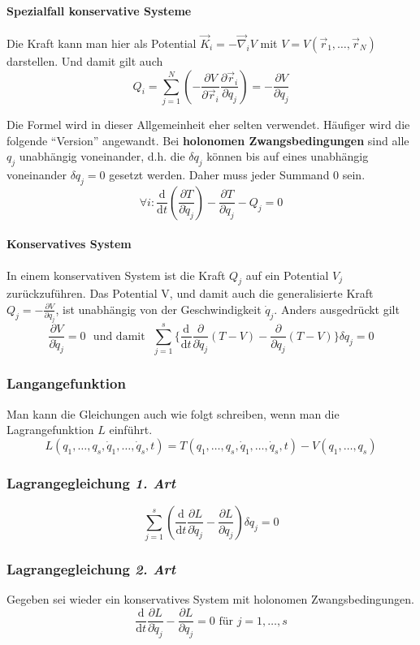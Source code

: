 \documentclass[oneside]{book}
\theoremstyle{definition}
\renewcommand{\d}{\mathrm d}
\newcommand{\dd}[1]{\frac{\d}{\d #1}}
\newcommand{\fpartial}[1]{\frac{\partial}{\partial #1}}
\newcommand{\ffpartial}[2]{\frac{\partial #1}{\partial #2}}
\begin{document}
\paragraph{Spezialfall konservative Systeme}
Die Kraft kann man hier als Potential $\vec{K}_i = - \vec\nabla_i V$ mit $V = V(\vec{r}_1, \dots, \vec{r}_N)$ darstellen. Und damit gilt auch
$$Q_i = \sum_{j = 1}^N (- \frac{\partial V}{\partial \vec{r}_i} \ffpartial{\vec{r}_i}{q_j}) = - \ffpartial{V}{q_j}$$

Die Formel wird in dieser Allgemeinheit eher selten verwendet. Häufiger wird die folgende "`Version"' angewandt. Bei \textbf{holonomen Zwangsbedingungen} sind alle $q_j$ unabhängig voneinander, d.h. die $\delta q_j$  können bis auf eines unabhängig voneinander $\delta q_j = 0$ gesetzt werden. Daher muss jeder Summand 0 sein.
$$\forall i:  \dd t ( \ffpartial{T}{\dot{q}_j}) - \ffpartial{T}{q_j} - Q_j = 0$$

\paragraph{Konservatives System}
In einem konservativen System ist die Kraft $Q_j$ auf ein Potential $V_j$ zurückzuführen. Das Potential V, und damit auch die generalisierte Kraft $Q_j = - \ffpartial{V}{q_j}$, ist unabhängig von der Geschwindigkeit $\dot{q}_j$. Anders ausgedrückt gilt
$$\ffpartial{V}{\dot q_j} = 0 \text{~ und damit ~} \sum_{j=1}^s \{  \dd{t} \fpartial{\dot{q}_j} (T-V) - \fpartial{q_j} (T -V) \} \delta q_j = 0$$

\subsubsection{Langangefunktion}
Man kann die Gleichungen auch wie folgt schreiben, wenn man die Lagrangefunktion $L$ einführt.
$$L(q_1, \dots, q_s, \dot{q}_1, \dots, \dot{q}_s, t) = T(q_1, \dots, q_s, \dot{q}_1, \dots, \dot{q}_s, t) - V(q_1, \dots, q_s)$$

\subsubsection{Lagrangegleichung \textit{1. Art}}
$$\sum_{j = 1}^s  (  \dd{t} \ffpartial{L}{\dot{q}_j} - \ffpartial{L}{q_j}  ) \delta q_j = 0$$

\subsubsection{Lagrangegleichung \textit{2. Art}}
Gegeben sei wieder ein konservatives System mit holonomen Zwangsbedingungen.
$$ \dd{t} \ffpartial{L}{\dot{q}_j} - \ffpartial{L}{q_j} = 0 \text{~für~} j= 1, \dots, s$$
\end{document}
